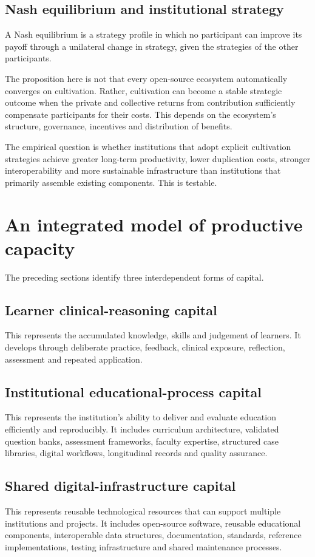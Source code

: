 \documentclass[11pt,a4paper]{article}
\begin{document}
\subsection{Nash equilibrium and institutional strategy}
A Nash equilibrium is a strategy profile in which no participant can improve its payoff through a unilateral change in strategy, given the strategies of the other participants.

The proposition here is not that every open-source ecosystem automatically converges on cultivation. Rather, cultivation can become a stable strategic outcome when the private and collective returns from contribution sufficiently compensate participants for their costs. This depends on the ecosystem's structure, governance, incentives and distribution of benefits.

The empirical question is whether institutions that adopt explicit cultivation strategies achieve greater long-term productivity, lower duplication costs, stronger interoperability and more sustainable infrastructure than institutions that primarily assemble existing components. This is testable.

\section{An integrated model of productive capacity}
The preceding sections identify three interdependent forms of capital.

\subsection{Learner clinical-reasoning capital}
This represents the accumulated knowledge, skills and judgement of learners. It develops through deliberate practice, feedback, clinical exposure, reflection, assessment and repeated application.

\subsection{Institutional educational-process capital}
This represents the institution's ability to deliver and evaluate education efficiently and reproducibly. It includes curriculum architecture, validated question banks, assessment frameworks, faculty expertise, structured case libraries, digital workflows, longitudinal records and quality assurance.

\subsection{Shared digital-infrastructure capital}
This represents reusable technological resources that can support multiple institutions and projects. It includes open-source software, reusable educational components, interoperable data structures, documentation, standards, reference implementations, testing infrastructure and shared maintenance processes.
\end{document}
